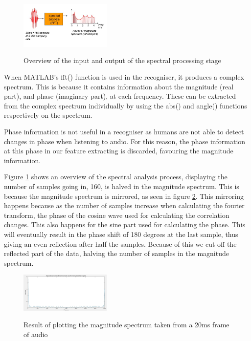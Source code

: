 \documentclass[journal]{IEEEtran}
\begin{document}
\begin{figure}[!htb]
	\centering
	\captionsetup{justification=centering}
	\includegraphics[width=0.4\textwidth]{specanal.jpg}\\
	\caption{Overview of the input and output of the spectral processing stage}\label{fig:specanal}
\end{figure}

When {\selectfont MATLAB's fft()} function is used in the recogniser, it produces a complex spectrum. This is because it contains information about the magnitude (real part), and phase (imaginary part), at each frequency. These can be extracted from the complex spectrum individually by using the {\selectfont abs()} and {\selectfont angle()} functions respectively on the spectrum.

Phase information is not useful in a recogniser as humans are not able to detect changes in phase when listening to audio. For this reason, the phase information at this phase in our feature extracting is discarded, favouring the magnitude information.

Figure \ref{fig:specanal} shows an overview of the spectral analysis process, displaying the number of samples going in, 160, is halved in the magnitude spectrum. This is because the magnitude spectrum is mirrored, as seen in figure \ref{fig:magspecexample}. This mirroring happens because as the number of samples increase when calculating the fourier transform, the phase of the cosine wave used for calculating the correlation changes. This also happens for the sine part used for calculating the phase. This will eventually result in the phase shift of 180 degrees at the last sample, thus giving an even reflection after half the samples. Because of this we cut off the reflected part of the data, halving the number of samples in the magnitude spectrum.

\begin{figure}[H]
	\centering
	\captionsetup{justification=centering}
	\includegraphics[width=0.4\textwidth]{magSpecExample.jpg}\\
	\caption{Result of plotting the magnitude spectrum taken from a 20ms frame of audio}\label{fig:magspecexample}
\end{figure}
\end{document}
